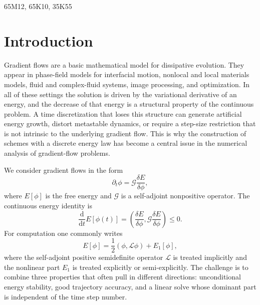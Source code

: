 \documentclass[10pt,onefignum,onetabnum,hidelinks]{siamart251216}
\begin{document}
\begin{MSCcodes}
65M12, 65K10, 35K55
\end{MSCcodes}




\section{Introduction}
\label{sec:introduction}

Gradient flows are a basic mathematical model for dissipative evolution.  They appear in phase-field models for interfacial motion, nonlocal and local materials models, fluid and complex-fluid systems, image processing, and optimization.  In all of these settings the solution is driven by the variational derivative of an energy, and the decrease of that energy is a structural property of the continuous problem.  A time discretization that loses this structure can generate artificial energy growth, distort metastable dynamics, or require a step-size restriction that is not intrinsic to the underlying gradient flow.  This is why the construction of schemes with a discrete energy law has become a central issue in the numerical analysis of gradient-flow problems.

We consider gradient flows in the form
\begin{equation}\label{eq:intro-gf}
  \partial_t \phi = \mathcal G \frac{\delta E}{\delta \phi},
\end{equation}
where $E[\phi]$ is the free energy and $\mathcal G$ is a self-adjoint nonpositive operator.  The continuous energy identity is
\begin{equation*}
  \frac{\mathrm d}{\mathrm dt}E[\phi(t)]
  = \left(\frac{\delta E}{\delta \phi},\mathcal G\frac{\delta E}{\delta \phi}\right) \le 0.
\end{equation*}
For computation one commonly writes
\begin{equation}\label{eq:intro-splitting}
  E[\phi]=\frac12(\phi,\mathcal L\phi)+E_1[\phi],
\end{equation}
where the self-adjoint positive semidefinite operator $\mathcal L$ is treated implicitly and the nonlinear part $E_1$ is treated explicitly or semi-explicitly.  The challenge is to combine three properties that often pull in different directions: unconditional energy stability, good trajectory accuracy, and a linear solve whose dominant part is independent of the time step number.
\end{document}
